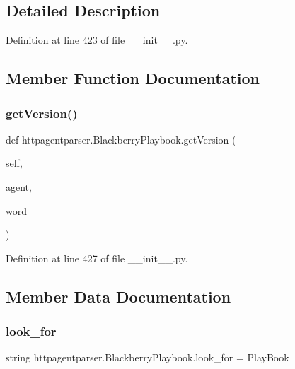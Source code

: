 \subsection{Detailed Description}


Definition at line 423 of file \+\_\+\+\_\+init\+\_\+\+\_\+.\+py.



\subsection{Member Function Documentation}
\hypertarget{classhttpagentparser_1_1_blackberry_playbook_a6c2264f4b6febc3ba9a3de63d4bdf67f}{}\label{classhttpagentparser_1_1_blackberry_playbook_a6c2264f4b6febc3ba9a3de63d4bdf67f} 
\subsubsection{\texorpdfstring{get\+Version()}{getVersion()}}
{\footnotesize\ttfamily def httpagentparser.\+Blackberry\+Playbook.\+get\+Version (\begin{DoxyParamCaption}\item[{}]{self,  }\item[{}]{agent,  }\item[{}]{word }\end{DoxyParamCaption})}



Definition at line 427 of file \+\_\+\+\_\+init\+\_\+\+\_\+.\+py.



\subsection{Member Data Documentation}
\hypertarget{classhttpagentparser_1_1_blackberry_playbook_a11a78eca2ec42a408a0576fa114470a4}{}\label{classhttpagentparser_1_1_blackberry_playbook_a11a78eca2ec42a408a0576fa114470a4} 
\subsubsection{\texorpdfstring{look\+\_\+for}{look\_for}}
{\footnotesize\ttfamily string httpagentparser.\+Blackberry\+Playbook.\+look\+\_\+for = \textquotesingle{}Play\+Book\textquotesingle{}\hspace{0.3cm}{\ttfamily [static]}}



